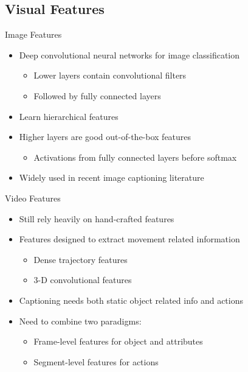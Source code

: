 \documentclass{beamer}
\begin{document}
\subsection{Visual Features}
\begin{frame}{Image Features}
\begin{itemize}
\item Deep convolutional neural networks for image classification 
    \begin{itemize}
        \item Lower layers contain convolutional filters 
        \item Followed by fully connected layers
    \end{itemize}
\item Learn hierarchical features
\item Higher layers are good out-of-the-box features  
    \begin{itemize}    
        \item Activations from fully connected layers before softmax 
    \end{itemize}
\item Widely used in recent image captioning literature~\cite{Vinyals_2015_CVPR,Fang2015} 
\end{itemize} 
\end{frame}
\begin{frame}{Video Features}
\begin{itemize}
\item Still rely heavily on hand-crafted features\\
\item Features designed to extract movement related information\\
        \begin{itemize}
            \item Dense trajectory features
            \item 3-D convolutional features
        \end{itemize}
\item Captioning needs both static object related info and actions\\ 
\item Need to combine two paradigms: 
   \begin{itemize}
     \item Frame-level features for object and attributes
     \item Segment-level features for actions
   \end{itemize}
\end{itemize} 
\end{frame}
\end{document}
